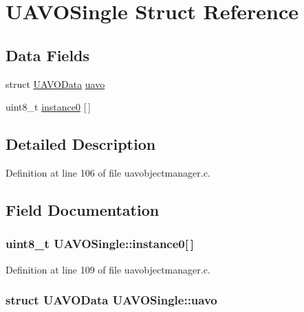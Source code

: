 \hypertarget{struct_u_a_v_o_single}{\section{\-U\-A\-V\-O\-Single \-Struct \-Reference}
\label{struct_u_a_v_o_single}
}
\subsection*{\-Data \-Fields}
\begin{DoxyCompactItemize}
\item 
struct \hyperlink{struct_u_a_v_o_data}{\-U\-A\-V\-O\-Data} \hyperlink{struct_u_a_v_o_single_adc5ae49c5f1cc194e3df35a0652d9a13}{uavo}
\item 
uint8\-\_\-t \hyperlink{struct_u_a_v_o_single_a411e3c7c88a81c2f1cd74cab9a3ab5ec}{instance0} \mbox{[}$\,$\mbox{]}
\end{DoxyCompactItemize}


\subsection{\-Detailed \-Description}


\-Definition at line 106 of file uavobjectmanager.\-c.



\subsection{\-Field \-Documentation}
\hypertarget{struct_u_a_v_o_single_a411e3c7c88a81c2f1cd74cab9a3ab5ec}{
\subsubsection[{instance0}]{\setlength{\rightskip}{0pt plus 5cm}uint8\-\_\-t {\bf \-U\-A\-V\-O\-Single\-::instance0}\mbox{[}$\,$\mbox{]}}}\label{struct_u_a_v_o_single_a411e3c7c88a81c2f1cd74cab9a3ab5ec}


\-Definition at line 109 of file uavobjectmanager.\-c.

\hypertarget{struct_u_a_v_o_single_adc5ae49c5f1cc194e3df35a0652d9a13}{
\subsubsection[{uavo}]{\setlength{\rightskip}{0pt plus 5cm}struct {\bf \-U\-A\-V\-O\-Data} {\bf \-U\-A\-V\-O\-Single\-::uavo}}}\label{struct_u_a_v_o_single_adc5ae49c5f1cc194e3df35a0652d9a13}


